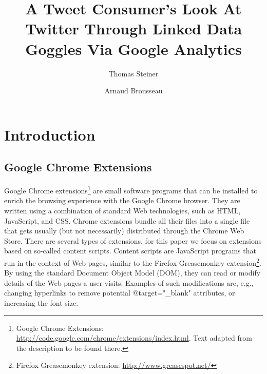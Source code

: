 \documentclass[runningheads,a4paper]{llncs}
\begin{document}
\mainmatter  %

\title{A Tweet Consumer's Look At Twitter Through Linked Data Goggles Via Google Analytics}


%
%
\author{Thomas Steiner \and Arnaud Brousseau}

%
%


\maketitle

\begin{abstract}

\end{abstract}

\section{Introduction}

\subsection{Google Chrome Extensions}
Google Chrome extensions\footnote{Google Chrome Extensions: \url{http://code.google.com/chrome/extensions/index.html}. Text adapted from the description to be found there.} are small software programs that can be installed to enrich the browsing experience with the Google Chrome browser. They are written using a combination of standard Web technologies, such as HTML, JavaScript, and CSS. Chrome extensions bundle all their files into a single file that gets usually (but not necessarily) distributed through the Chrome Web Store. There are several types of extensions, for this paper we focus on extensions based on so-called content scripts. Content scripts are JavaScript programs that run in the context of Web pages, similar to the Firefox Greasemonkey extension\footnote{Firefox Greasemonkey extension: \url{http://www.greasespot.net/}}. By using the standard Document Object Model (DOM), they can read or modify details of the Web pages a user visits. Examples of such modifications are, e.g., changing hyperlinks to remove potential @target="\_blank" attributes, or increasing the font size.
\end{document}
